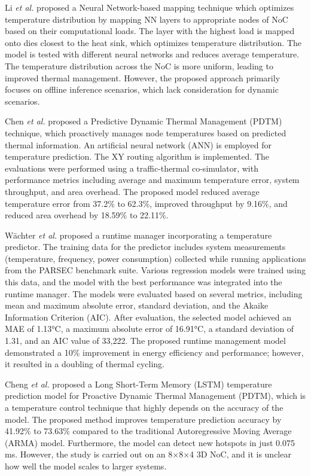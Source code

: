 \documentclass[conference]{IEEEtran}
\begin{document}
Li \textit{et al.}\cite{9} proposed a Neural Network-based mapping technique which optimizes temperature distribution by mapping NN layers to appropriate nodes of NoC based on their computational loads. The layer with the highest load is mapped onto dies closest to the heat sink, which optimizes temperature distribution. The model is tested with different neural networks and reduces average temperature. The temperature distribution across the NoC is more uniform, leading to improved thermal management. However, the proposed approach primarily focuses on offline inference scenarios, which lack consideration for dynamic scenarios.

Chen \textit{et al.}\cite{10} proposed a Predictive Dynamic Thermal Management (PDTM) technique, which proactively manages node temperatures based on predicted thermal information. An artificial neural network (ANN) is employed for temperature prediction. The XY routing algorithm is implemented. The evaluations were performed using a traffic-thermal co-simulator, with performance metrics including average and maximum temperature error, system throughput, and area overhead. The proposed model reduced average temperature error from 37.2\% to 62.3\%, improved throughput by 9.16\%, and reduced area overhead by 18.59\% to 22.11\%.

Wächter \textit{et al.}\cite{11} proposed a runtime manager incorporating a temperature predictor. The training data for the predictor includes system measurements (temperature, frequency, power consumption) collected while running applications from the PARSEC benchmark suite. Various regression models were trained using this data, and the model with the best performance was integrated into the runtime manager. The models were evaluated based on several metrics, including mean and maximum absolute error, standard deviation, and the Akaike Information Criterion (AIC). After evaluation, the selected model achieved an MAE of 1.13°C, a maximum absolute error of 16.91°C, a standard deviation of 1.31, and an AIC value of 33,222. The proposed runtime management model demonstrated a 10\% improvement in energy efficiency and performance; however, it resulted in a doubling of thermal cycling.

Cheng \textit{et al.}\cite{12} proposed a Long Short-Term Memory (LSTM) temperature prediction model for Proactive Dynamic Thermal Management (PDTM), which is a temperature control technique that highly depends on the accuracy of the model. The proposed method improves temperature prediction accuracy by 41.92\% to 73.63\% compared to the traditional Autoregressive Moving Average (ARMA) model. Furthermore, the model can detect new hotspots in just 0.075 ms. However, the study is carried out on an 8×8×4 3D NoC, and it is unclear how well the model scales to larger systems.
\end{document}
